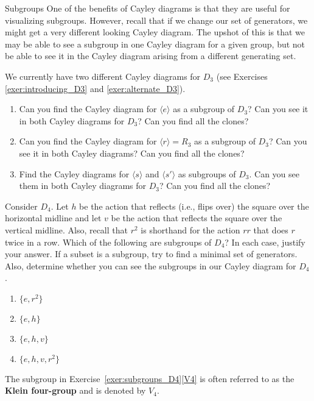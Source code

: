 \begin{section}{Subgroups}
One of the benefits of Cayley diagrams is that they are useful for visualizing subgroups.  However, recall that if we change our set of generators, we might get a very different looking Cayley diagram.  The upshot of this is that we may be able to see a subgroup in one Cayley diagram for a given group, but not be able to see it in the Cayley diagram arising from a different generating set.

\begin{exercise}
We currently have two different Cayley diagrams for $D_3$ (see Exercises \ref{exer:introducing_D3} and \ref{exer:alternate_D3}).  
\begin{enumerate}[label=\rm{(\alph*)}]
\item Can you find the Cayley diagram for $\langle e\rangle$ as a subgroup of $D_3$?  Can you see it in both Cayley diagrams for $D_3$?  Can you find all the clones?
\item Can you find the Cayley diagram for $\langle r\rangle =R_3$ as a subgroup of $D_3$?  Can you see it in both Cayley diagrams?  Can you find all the clones?
\item Find the Cayley diagrams for $\langle s\rangle$ and $\langle s'\rangle$ as subgroups of $D_3$.  Can you see them in both Cayley diagrams for $D_3$?  Can you find all the clones?
\end{enumerate}
\end{exercise}

\begin{exercise}\label{exer:subgroups_D4}
Consider $D_4$.  Let $h$ be the action that reflects (i.e., flips over) the square over the horizontal midline and let $v$ be the action that reflects the square over the vertical midline.  Also, recall that $r^2$ is shorthand for the action $rr$ that does $r$ twice in a row.  Which of the following are subgroups of $D_4$?  In each case, justify your answer.  If a subset is a subgroup, try to find a minimal set of generators.  Also, determine whether you can see the subgroups in our Cayley diagram for $D_4$.
\begin{enumerate}[label=\rm{(\alph*)}]
\item $\{e, r^2\}$
\item $\{e,h\}$
\item $\{e, h, v\}$
\item\label{V4} $\{e, h, v, r^2\}$
\end{enumerate}
\end{exercise}

The subgroup in Exercise~\ref{exer:subgroups_D4}\ref{V4} is often referred to as the \textbf{Klein four-group} and is denoted by $V_4$.


\end{section}
